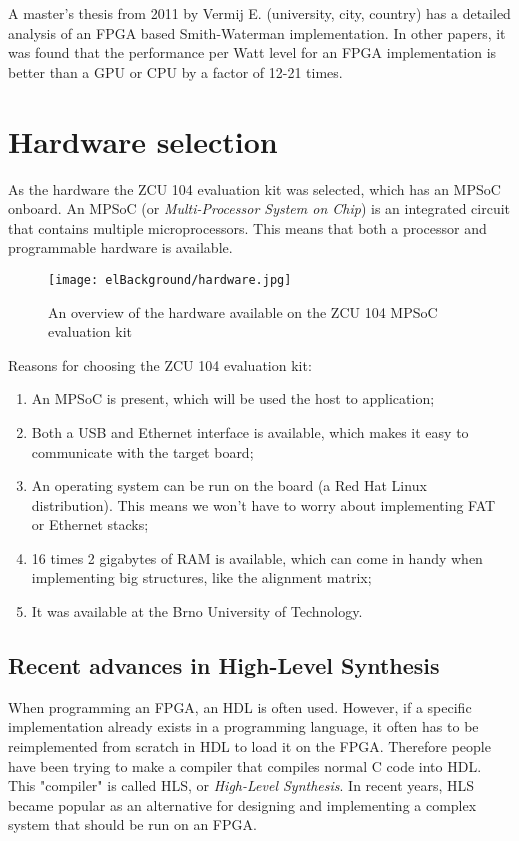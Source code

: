 A master's thesis from 2011 by Vermij E. (university, city, country) has a detailed analysis of an FPGA based Smith-Waterman implementation. In other papers, it was found that the performance per Watt level for an FPGA implementation is better than a GPU or CPU by a factor of 12-21 times.

\section{Hardware selection}

As the hardware the ZCU 104 evaluation kit was selected, which has an MPSoC onboard. An MPSoC (or \emph{Multi-Processor System on Chip}) is an integrated circuit that contains multiple microprocessors. This means that both a processor and programmable hardware is available.

\begin{figure}[H]
	\centering
	\texttt{[image: elBackground/hardware.jpg]}
	\caption{An overview of the hardware available on the ZCU 104 MPSoC evaluation kit}
	\label{fig:hardware}
\end{figure}

Reasons for choosing the ZCU 104 evaluation kit:
\begin{enumerate}
	\item An MPSoC is present, which will be used the host to application;
	\item Both a USB and Ethernet interface is available, which makes it easy to communicate with the target board;
	\item An operating system can be run on the board (a Red Hat Linux distribution). This means we won't have to worry about implementing FAT or Ethernet stacks;
	\item 16 times 2 gigabytes of RAM is available, which can come in handy when implementing big structures, like the alignment matrix;
	\item It was available at the Brno University of Technology.
\end{enumerate}

\subsection{Recent advances in High-Level Synthesis}

When programming an FPGA, an HDL is often used. However, if a specific implementation already exists in a programming language, it often has to be reimplemented from scratch in HDL to load it on the FPGA. Therefore people have been trying to make a compiler that compiles normal C code into HDL. This "compiler" is called HLS, or \emph{ High-Level Synthesis}. In recent years, HLS became popular as an alternative for designing and implementing a complex system that should be run on an FPGA.

